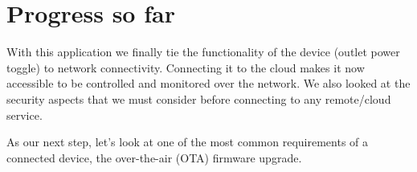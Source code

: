 \documentclass[main.tex]{subfiles}
\begin{document}
\section{Progress so far}
With this application we finally tie the functionality of the device (outlet power toggle) to network connectivity. Connecting it to the cloud makes it now accessible to be controlled and monitored over the network. We also looked at the security aspects that we must consider before connecting to any remote/cloud service.

As our next step, let's look at one of the most common requirements of a connected device, the over-the-air (OTA) firmware upgrade.
\end{document}
